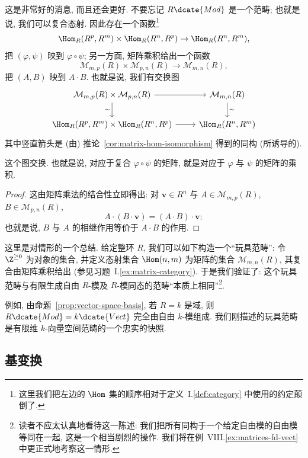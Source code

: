 这是非常好的消息, 而且还会更好. 不要忘记 $R\dcate{Mod}$ 是一个范畴; 也就是说, 我们可以复合态射. 因此存在一个函数\footnote{这里我们把左边的 $\Hom$ 集的顺序相对于定义~I.\ref{def:category} 中使用的约定颠倒了.}
\[
\Hom_R(R^p,R^m)\times\Hom_R(R^n,R^p)\to\Hom_R(R^n,R^m),
\]
把 $(\varphi,\psi)$ 映到 $\varphi\circ\psi$; 另一方面, 矩阵乘积给出一个函数
\[
\mathcal{M}_{m,p}(R)\times\mathcal{M}_{p,n}(R)\to\mathcal{M}_{m,n}(R),
\]
把 $(A,B)$ 映到 $A\cdot B$. 也就是说, 我们有交换图
\[
\begin{tikzcd}
\mathcal{M}_{m,p}(R)\times\mathcal{M}_{p,n}(R) \arrow[r] \arrow[d, "\sim"'] & \mathcal{M}_{m,n}(R) \arrow[d, "\sim"] \\
\Hom_R(R^p,R^m)\times\Hom_R(R^n,R^p) \arrow[r] & \Hom_R(R^n,R^m)
\end{tikzcd}
\]
其中竖直箭头是 (由) 推论~\ref{cor:matrix-hom-isomorphism} 得到的同构 (所诱导的).

\begin{lemma}\label{lem:matrix-composition-commutes}
这个图交换. 也就是说, 对应于复合 $\varphi\circ\psi$ 的矩阵, 就是对应于 $\varphi$ 与 $\psi$ 的矩阵的乘积.
\end{lemma}

\begin{proof}
这由矩阵乘法的结合性立即得出: 对 $\mathbf{v}\in R^n$ 与 $A\in\mathcal{M}_{m,p}(R)$, $B\in\mathcal{M}_{p,n}(R)$,
\[
A\cdot(B\cdot\mathbf{v}) = (A\cdot B)\cdot\mathbf{v};
\]
也就是说, $B$ 与 $A$ 的相继作用等价于 $A\cdot B$ 的作用.
\end{proof}

这里是对情形的一个总结. 给定整环 $R$, 我们可以如下构造一个``玩具范畴'': 令 $\Z^{\ge0}$ 为对象的集合, 并定义态射集合 $\Hom(n,m)$ 为矩阵的集合 $\mathcal{M}_{m,n}(R)$, 其复合由矩阵乘积给出 (参见习题~I.\ref{ex:matrix-category}). 于是我们验证了: 这个玩具范畴与有限生成自由 $R$-模及 $R$-模同态的范畴``本质上相同''\footnote{读者不应太认真地看待这一陈述: 我们把所有同构于一个给定自由模的自由模等同在一起, 这是一个相当剧烈的操作. 我们将在例~VIII.\ref{ex:matrices-fd-vect} 中更正式地考察这一情形.}.

例如, 由命题~\ref{prop:vector-space-basis}, 若 $R=k$ 是域, 则 $R\dcate{Mod}=k\dcate{Vect}$ 完全由自由 $k$-模组成. 我们刚描述的玩具范畴是有限维 $k$-向量空间范畴的一个忠实的快照.

\subsection{基变换}
\label{subsec:change-of-basis}

